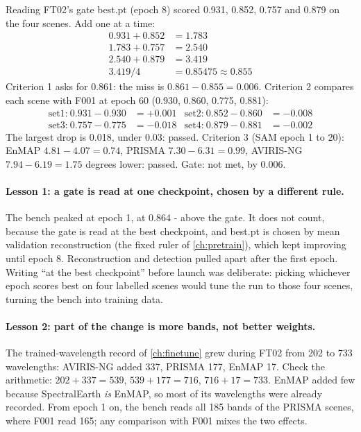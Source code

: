 
\begin{worked}[label={we:ftruns:gate}]{Reading FT02's gate}
best.pt (epoch 8) scored 0.931, 0.852, 0.757 and 0.879 on the four scenes. Add one at a time:
\begin{align*}
0.931 + 0.852 &= 1.783\\
1.783 + 0.757 &= 2.540\\
2.540 + 0.879 &= 3.419\\
3.419 / 4 &= 0.85475 \approx 0.855
\end{align*}
Criterion 1 asks for 0.861: the miss is $0.861 - 0.855 = 0.006$. Criterion 2 compares each scene with F001 at epoch
60 (0.930, 0.860, 0.775, 0.881):
\begin{align*}
\text{set1:}\ 0.931 - 0.930 &= +0.001 & \text{set2:}\ 0.852 - 0.860 &= -0.008\\
\text{set3:}\ 0.757 - 0.775 &= -0.018 & \text{set4:}\ 0.879 - 0.881 &= -0.002
\end{align*}
The largest drop is 0.018, under 0.03: passed. Criterion 3 (SAM epoch 1 to 20): EnMAP $4.81 - 4.07 = 0.74$, PRISMA
$7.30 - 6.31 = 0.99$, AVIRIS-NG $7.94 - 6.19 = 1.75$ degrees lower: passed. Gate: not met, by 0.006.
\end{worked}

\paragraph{Lesson 1: a gate is read at one checkpoint, chosen by a different rule.}
The bench peaked at epoch 1, at 0.864 - above the gate. It does not count, because the gate is read at the best
checkpoint, and best.pt is chosen by mean validation reconstruction (the fixed ruler of \cref{ch:pretrain}), which
kept improving until epoch 8. Reconstruction and detection pulled apart after the first epoch. Writing ``at the best
checkpoint'' before launch was deliberate: picking whichever epoch scores best on four labelled scenes would tune the
run to those four scenes, turning the bench into training data.

\paragraph{Lesson 2: part of the change is more bands, not better weights.}
The trained-wavelength record of \cref{ch:finetune} grew during FT02 from 202 to 733 wavelengths: AVIRIS-NG added
337, PRISMA 177, EnMAP 17. Check the arithmetic:
$202 + 337 = 539$, $539 + 177 = 716$, $716 + 17 = 733$. EnMAP added few because SpectralEarth \emph{is} EnMAP, so
most of its wavelengths were already recorded. From epoch 1 on, the bench reads all 185 bands of the PRISMA scenes,
where F001 read 165; any comparison with F001 mixes the two effects.

